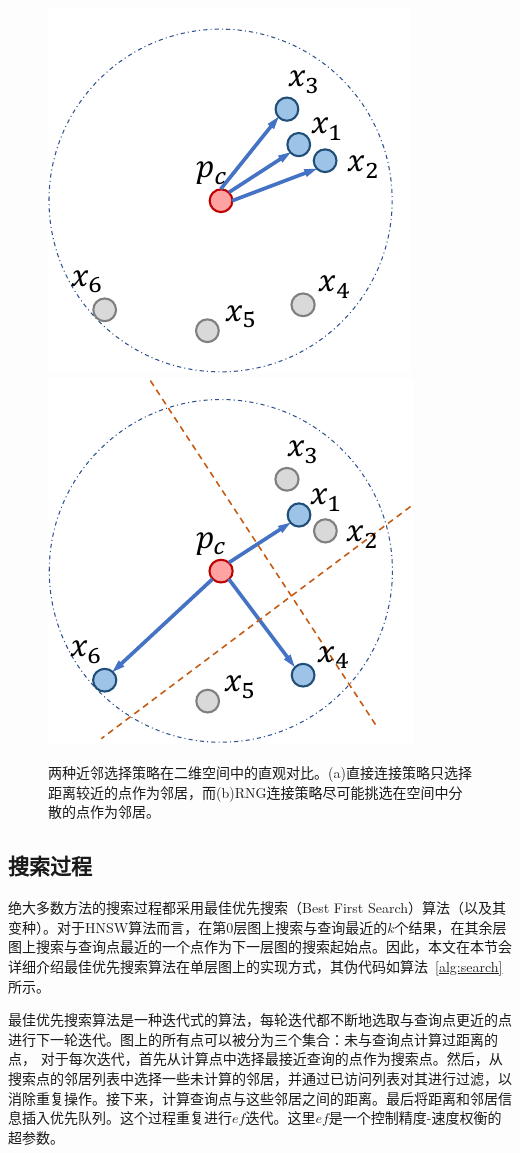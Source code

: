 \begin{figure}
  \centering
    {\includegraphics[width=0.35\linewidth]{figures/Background/select-naive.pdf}}
    {\includegraphics[width=0.35\linewidth]{figures/Background/select-rng.pdf}}
  \caption{两种近邻选择策略在二维空间中的直观对比。(a)直接连接策略只选择距离较近的点作为邻居，而(b)RNG连接策略尽可能挑选在空间中分散的点作为邻居。}
  \label{fig:nbor-select}
\end{figure}



\subsection{搜索过程}

绝大多数\ganns 方法的搜索过程都采用最佳优先搜索\cite{nsg-2019, ganns-survey-2021}（Best First Search）算法（以及其变种）。对于HNSW算法而言，在第0层图上搜索与查询最近的$k$个结果，在其余层图上搜索与查询点最近的一个点作为下一层图的搜索起始点。因此，本文在本节会详细介绍最佳优先搜索算法在单层图上的实现方式，其伪代码如算法~\ref{alg:search}所示。

最佳优先搜索算法是一种迭代式的算法，每轮迭代都不断地选取与查询点更近的点进行下一轮迭代。图上的所有点可以被分为三个集合：未与查询点计算过距离的点，
对于每次迭代，首先从计算点中选择最接近查询的点作为搜索点。然后，从搜索点的邻居列表中选择一些未计算的邻居，并通过已访问列表对其进行过滤，以消除重复操作。接下来，计算查询点与这些邻居之间的距离。最后将距离和邻居信息插入优先队列。这个过程重复进行$ef$迭代。这里$ef$是一个控制精度-速度权衡的超参数。


